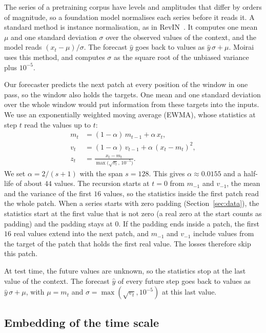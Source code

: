 The series of a pretraining corpus have levels and amplitudes that
differ by orders of magnitude, so a foundation model normalises each
series before it reads it. A standard method is instance
normalisation, as in RevIN~\citep{kim2022revin}. It computes one mean
$\mu$ and one standard deviation $\sigma$ over the observed values of
the context, and the model reads $(x_t - \mu) / \sigma$. The forecast
$\hat{y}$ goes back to values as $\hat{y}\,\sigma + \mu$.
Moirai~\citep{woo2024moirai} uses this method, and computes $\sigma$ as
the square root of the unbiased variance plus $10^{-5}$.

Our forecaster predicts the next patch at every position of the window
in one pass, so the window also holds the targets. One mean and one
standard deviation over the whole window would put information from
these targets into the inputs. We use an
exponentially weighted moving average (EWMA), whose statistics at
step $t$ read the values up to $t$:
\begin{align*}
  m_t &= (1 - \alpha)\, m_{t-1} + \alpha\, x_t, \\
  v_t &= (1 - \alpha)\, v_{t-1} + \alpha\, (x_t - m_t)^2, \\
  z_t &= \frac{x_t - m_t}{\max\big(\sqrt{v_t},\, 10^{-5}\big)}.
\end{align*}
We set $\alpha = 2 / (s + 1)$ with the span $s = 128$. This gives
$\alpha \approx 0.0155$ and a half-life of about $44$ values. The
recursion starts at $t = 0$ from $m_{-1}$ and $v_{-1}$, the mean and
the variance of the first $16$ values, so the statistics inside the
first patch read the whole patch. When a series starts with zero padding
(Section~\ref{sec:data}), the statistics start at the first value that
is not zero (a real zero at the start counts as padding) and the
padding stays at $0$. If the padding ends inside a patch, the first
$16$ real values extend into the next patch, and $m_{-1}$ and
$v_{-1}$ include values from the target of the patch that holds the
first real value. The losses therefore skip this patch.

At test time, the future values are unknown, so the statistics stop at
the last value of the context. The forecast $\hat{y}$ of every future
step goes back to values as $\hat{y}\,\sigma + \mu$, with $\mu = m_t$
and $\sigma = \max(\sqrt{v_t}, 10^{-5})$ at this last value.

\subsection{Embedding of the time scale}
\label{sec:scale-embedding}

